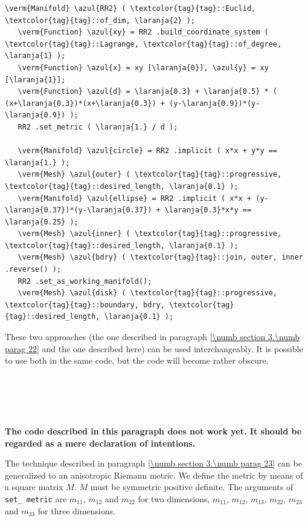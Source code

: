 \begin{Verbatim}[commandchars=\\\{\},formatcom=\small\tt,frame=single,
   label=code not working,rulecolor=\color{coment},
   baselinestretch=0.94,framesep=2mm                                   ]
   \verm{Manifold} \azul{RR2} ( \textcolor{tag}{tag}::Euclid, \textcolor{tag}{tag}::of_dim, \laranja{2} );
   \verm{Function} \azul{xy} = RR2 .build_coordinate_system ( \textcolor{tag}{tag}::Lagrange, \textcolor{tag}{tag}::of_degree, \laranja{1} );
   \verm{Function} \azul{x} = xy [\laranja{0}], \azul{y} = xy [\laranja{1}];
   \verm{Function} \azul{d} = \laranja{0.3} + \laranja{0.5} * ( (x+\laranja{0.3})*(x+\laranja{0.3}) + (y-\laranja{0.9})*(y-\laranja{0.9}) );
   RR2 .set_metric ( \laranja{1.} / d );
   
   \verm{Manifold} \azul{circle} = RR2 .implicit ( x*x + y*y == \laranja{1.} );
   \verm{Mesh} \azul{outer} ( \textcolor{tag}{tag}::progressive, \textcolor{tag}{tag}::desired_length, \laranja{0.1} );
   \verm{Manifold} \azul{ellipse} = RR2 .implicit ( x*x + (y-\laranja{0.37})*(y-\laranja{0.37}) + \laranja{0.3}*x*y == \laranja{0.25} );
   \verm{Mesh} \azul{inner} ( \textcolor{tag}{tag}::progressive, \textcolor{tag}{tag}::desired_length, \laranja{0.1} );
   \verm{Mesh} \azul{bdry} ( \textcolor{tag}{tag}::join, outer, inner .reverse() );
   RR2 .set_as_working_manifold();
   \verm{Mesh} \azul{disk} ( \textcolor{tag}{tag}::progressive, \textcolor{tag}{tag}::boundary, bdry, \textcolor{tag}{tag}::desired_length, \laranja{0.1} );
\end{Verbatim}

These two approaches (the one described in paragraph \ref{\numb section 3.\numb parag 22} and
the one described here) can be used interchangeably.
It is possible to use both in the same code, but the code will become rather obscure.


\section{~~}\label{\numb section 3.\numb parag 24}

{\normalfont\bfseries The code described in this paragraph does not work yet.
It should be regarded as a mere declaration of intentions.}
\medskip

The technique described in paragraph \ref{\numb section 3.\numb parag 23} can be generalized to
an anisotropic Riemann metric.
We define the metric by means of a square matrix $M$.
$M$ must be symmetric positive definite.
The arguments of {\small\tt set\_\,metric} are $ m_{11} $, $ m_{12} $ and $ m_{22} $
for two dimensions,
$ m_{11} $, $ m_{12} $, $ m_{13} $, $ m_{22} $, $ m_{23} $ and $ m_{33} $ for three dimensions.

